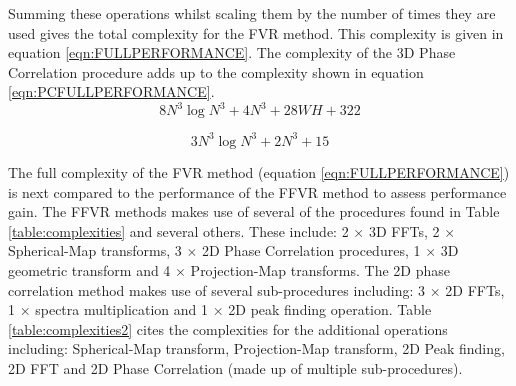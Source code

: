 Summing these operations whilst scaling them by the number of times they are used gives the total complexity for the FVR method. This complexity is given in equation \ref{eqn:FULLPERFORMANCE}. The complexity of the 3D Phase Correlation procedure adds up to the complexity shown in equation \ref{eqn:PCFULLPERFORMANCE}. \\

\begin{equation} \label{eqn:FULLPERFORMANCE}
8N^3\log{N^3} + 4N^3 + 28WH + 322
\end{equation}

\begin{equation} \label{eqn:PCFULLPERFORMANCE}
3N^3\log{N^3} + 2N^3 + 15
\end{equation}


The full complexity of the FVR method (equation \ref{eqn:FULLPERFORMANCE}) is next compared to the performance of the FFVR method to assess performance gain. The FFVR methods makes use of several of the procedures found in Table \ref{table:complexities} and several others. These include: 2 $\times$ 3D FFTs, 2 $\times$ Spherical-Map transforms, 3 $\times$ 2D Phase Correlation procedures, 1 $\times$ 3D geometric transform and 4 $\times$ Projection-Map transforms. The 2D phase correlation method makes use of several sub-procedures including: 3 $\times$ 2D FFTs, 1 $\times$ spectra multiplication and 1 $\times$ 2D peak finding operation. Table \ref{table:complexities2} cites the complexities for the additional operations including: Spherical-Map transform, Projection-Map transform, 2D Peak finding, 2D FFT and 2D Phase Correlation (made up of multiple sub-procedures). \\



\begin{table}[!htb]
\centering
\label{table:complexities2}
\\
\caption{Complexities for given Procedures}
\end{table}

